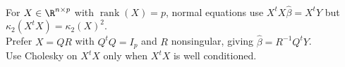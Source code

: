 \begin{perspective} \label{per:linear-model-numerical-solution-route} \\
For $X\in\R^{n\times p}$ with $\operatorname{rank}(X)=p$, normal equations use $X^tX\widehat{\beta}=X^tY$ but $\kappa_2(X^tX)=\kappa_2(X)^2$.\\
Prefer $X=QR$ with $Q^tQ=I_p$ and $R$ nonsingular, giving $\widehat{\beta}=R^{-1}Q^tY$.\\
Use Cholesky on $X^tX$ only when $X^tX$ is well conditioned.
\end{perspective}

